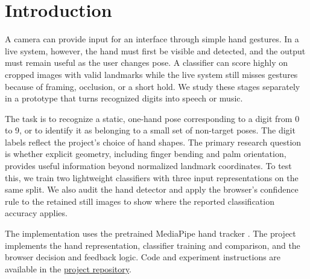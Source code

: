 \section{Introduction}
\label{sec:introduction}

A camera can provide input for an interface through simple hand gestures. In
a live system, however, the hand must first be visible and detected, and the
output must remain useful as the user changes pose. A classifier can score
highly on cropped images with valid landmarks while the live system still
misses gestures because of framing, occlusion, or a short hold. We study these
stages separately in a prototype that turns recognized digits into speech or
music.

The task is to recognize a static, one-hand pose corresponding to a digit
from 0 to 9, or to identify it as belonging to a small set of non-target
poses. The digit labels reflect the project's choice of hand shapes. The
primary research question is whether explicit geometry, including finger
bending and palm orientation, provides useful information beyond normalized
landmark coordinates. To test this, we train two lightweight classifiers with
three input representations on the same split. We also audit the hand
detector and apply the browser's confidence rule to the retained still images
to show where the reported classification accuracy applies.

The implementation uses the pretrained MediaPipe hand tracker
\cite{zhang2020mediapipe,mediapipehandlandmarker}. The project implements the
hand representation, classifier training and comparison, and the browser
decision and feedback logic. Code and experiment instructions are available in
the \href{https://github.com/centaurus-xie/csit5410-hand-gesture-recognition}
{project repository}.
